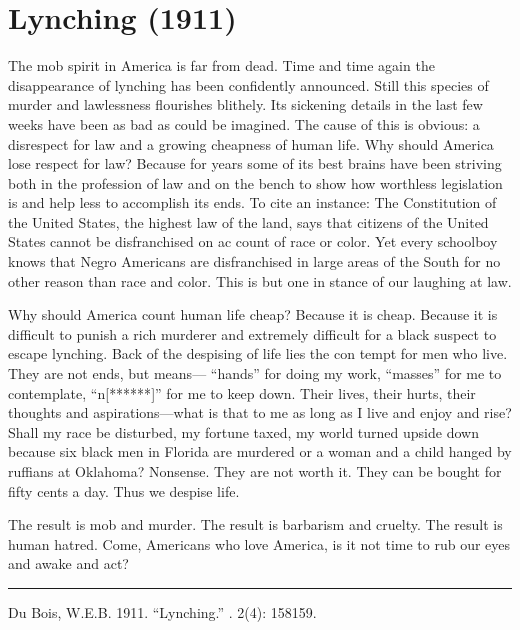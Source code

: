 \documentclass[letterpaper,10pt,english]{jupyterBook}
\begin{document}
\section{Lynching (1911)}
\label{\detokenize{Volumes/02/04/lynching:lynching-1911}}\label{\detokenize{Volumes/02/04/lynching::doc}}
\sphinxAtStartPar
The mob spirit in America is far from dead. Time and time again the disappearance of lynching has been confidently announced. Still this species of murder and lawlessness flourishes blithely. Its sickening details in the last few weeks have been as bad as could be imagined. The cause of this is obvious: a disrespect for law and a growing cheapness of human life. Why should America lose respect for law? Because for years some of its best brains have been striving both in the profession of law and on the bench to show how worthless legislation is and help­ less to accomplish its ends. To cite an instance: The Constitution of the United States, the highest law of the land, says that citizens of the United States cannot be disfranchised on ac­ count of race or color. Yet every schoolboy knows that Negro Americans are disfranchised in large areas of the South for no other reason than race and color. This is but one in­ stance of our laughing at law.

\sphinxAtStartPar
Why should America count human life cheap? Because it is cheap. Because it is difficult to punish a rich murderer and extremely difficult for a black suspect to escape lynching. Back of the despising of life lies the con­ tempt for men who live. They are not ends, but means— “hands” for doing my work, “masses” for me to contemplate, “n{[}******{]}” for me to keep down. Their lives, their hurts, their thoughts and aspirations—what is that to me as long as I live and enjoy and rise? Shall my race be disturbed, my fortune taxed, my world turned upside down because six black men in Florida are murdered or a woman and a child hanged by ruffians at Oklahoma? Nonsense. They are not worth it. They can be bought for fifty cents a day. Thus we despise life.

\sphinxAtStartPar
The result is mob and murder. The result is barbarism and cruelty. The result is human hatred. Come, Americans who love America, is it not time to rub our eyes and awake and act?


\bigskip\hrule\bigskip


\sphinxAtStartPar
{} Du Bois, W.E.B. 1911. “Lynching.”  . 2(4): 158\sphinxhyphen{}159.
\end{document}
